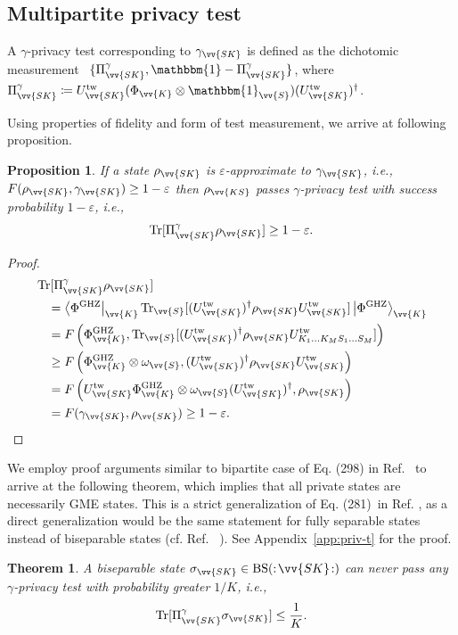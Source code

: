 \documentclass[aps,pra,twocolumn,superscriptaddress,longbibliography]{revtex4-1}
\def\Tr{\operatorname{Tr}}
\def\BS{\operatorname{BS}}
\def\GHZ{\operatorname{GHZ}}
\def\({\left(}
\def\){\right)}
\newcommand{\bbm}[1]{\mathbbm{#1}}
\newtheorem{theorem}{Theorem}
\newtheorem{proposition}{Proposition}
\begin{document}
\subsection{Multipartite privacy test}
A $\gamma$-privacy test corresponding to $\gamma_{\vv{SK}}$ is defined as the dichotomic measurement~\cite{WTB16}
$\{\Pi^{\gamma}_{\vv{SK}},\bbm{1}-\Pi^{\gamma}_{\vv{SK}}\}$, where $\Pi^{\gamma}_{\vv{SK}}\coloneqq U^{\text{tw}}_{\vv{SK}} (\Phi_{\vv{K}}\otimes\bbm{1}_{\vv{S}}) (U^{\text{tw}}_{\vv{SK}})^\dag$. 

Using properties of fidelity and form of test measurement, we arrive at following proposition. 
\begin{proposition}\label{thm:priv-test}
If a state $\rho_{\vv{SK}}$ is $\varepsilon$-approximate to $\gamma_{\vv{SK}}$, i.e., $F(\rho_{\vv{SK}},\gamma_{\vv{SK}})\geq 1-\varepsilon$ then $\rho_{\vv{KS}}$ passes $\gamma$-privacy test with success probability $ 1-\varepsilon$, i.e., 
\begin{equation}
\Tr[\Pi^{\gamma}_{\vv{SK}}\rho_{\vv{SK}}] \geq 1-\varepsilon.
\end{equation} 
\end{proposition}
\begin{proof}
\begin{align}
& \Tr[\Pi^{\gamma}_{\vv{SK}}\rho_{\vv{SK}}]\nonumber \\
& \quad = \bra{\Phi^{\GHZ}}_{\vv{K}}\Tr_{\vv{S}}[(U^{\text{tw}}_{\vv{SK}})^\dag \rho_{\vv{SK}}U^{\text{tw}}_{\vv{SK}}]\ket{\Phi^{\GHZ}}_{\vv{K}}\\
&\quad = F\(\Phi^{\GHZ}_{\vv{K}},\Tr_{\vv{S}}[(U^{\text{tw}}_{\vv{SK}})^\dag \rho_{\vv{SK}}U^{\text{tw}}_{K_1\ldots K_MS_1\ldots S_M}]\)\\
&\quad \geq F\(\Phi^{\GHZ}_{\vv{K}}\otimes\omega_{\vv{S}},(U^{\text{tw}}_{\vv{SK}})^\dag \rho_{\vv{SK}}U^{\text{tw}}_{\vv{SK}}\)\\
&\quad = F\(U^{\text{tw}}_{\vv{SK}} \Phi^{\GHZ}_{\vv{K}}\otimes\omega_{\vv{S}}(U^{\text{tw}}_{\vv{SK}})^\dag, \rho_{\vv{SK}}\)\\
& \quad =F(\gamma_{\vv{SK}},\rho_{\vv{SK}})\geq 1-\varepsilon .
\end{align}
\end{proof}


We employ proof arguments similar to bipartite case of Eq. (298) in Ref.~\cite{HHHO09} to arrive at the following theorem, which implies that all private states are necessarily GME states. This is a strict generalization of Eq. (281)~in Ref. \cite{HHHO09}, as a direct generalization would be the same statement for fully separable states instead of biseparable states (cf. Ref. ~\cite{AH09}). See Appendix~\ref{app:priv-t} for the proof.
\begin{theorem}\label{thm:priv-gme}
A biseparable state $\sigma_{\vv{SK}}\in\BS(:\!\vv{SK}\!:)$ can never pass any $\gamma$-privacy test with probability greater $1/K$, i.e.,
\begin{align}
    \Tr[\Pi^{\gamma}_{\vv{SK}}\sigma_{\vv{SK}}]\leq \frac{1}{K}.
\end{align} 
\end{theorem}
\end{document}
